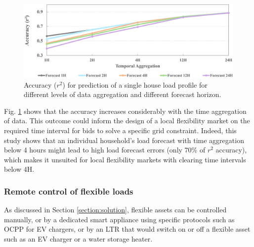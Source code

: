 \documentclass[conference]{IEEEtran}
\begin{document}
\begin{figure}[h]
	\centering
	\includegraphics[width=0.92\columnwidth]{Images/Forecast_Comparison.png}
	\caption{ Accuracy ($r^2$) for prediction of a single house load profile for different levels of data aggregation and different forecast horizon.}
	\label{Fig:ForecastAccuracy}
\end{figure}
Fig. \ref{Fig:ForecastAccuracy} shows that the accuracy increases considerably with the time aggregation of data. This outcome could inform the design of a local flexibility market on the required time interval  for bids to solve a specific grid constraint. Indeed, this study  shows that an individual household's load forecast with time aggregation  below 4 hours might lead to high load forecast errors (only 70\% of $r^2$ accuracy), which makes it unsuited for local flexibility markets with clearing time intervals below 4H.  
\subsubsection{Remote control of flexible loads}
As  discussed in Section \ref{section:solution}, flexible assets can be controlled manually, or by a dedicated smart appliance using specific protocols such as OCPP for EV chargers, or by an LTR that would switch on or off a  flexible asset such as an EV charger or a water storage heater.
\end{document}
